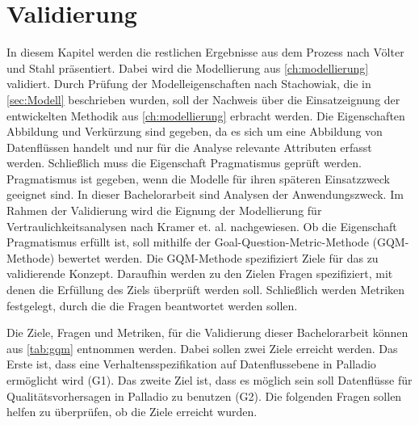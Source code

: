 
\chapter{Validierung}
\label{ch:validierung}
In diesem Kapitel werden die restlichen Ergebnisse aus dem Prozess nach Völter und Stahl \cite{StahlThomasVoelterMarkus2006} präsentiert. Dabei wird die Modellierung aus \autoref{ch:modellierung} validiert. Durch Prüfung der Modelleigenschaften nach Stachowiak, die in \autoref{sec:Modell} beschrieben wurden, soll der Nachweis über die Einsatzeignung der entwickelten Methodik aus \autoref{ch:modellierung} erbracht werden. Die Eigenschaften Abbildung und Verkürzung sind gegeben, da es sich um eine Abbildung von Datenflüssen handelt und nur für die Analyse relevante Attributen erfasst werden. Schließlich muss die Eigenschaft Pragmatismus geprüft werden. Pragmatismus ist gegeben, wenn die Modelle für ihren späteren Einsatzzweck geeignet sind. In dieser Bachelorarbeit sind Analysen der Anwendungszweck. Im Rahmen der Validierung wird die Eignung der Modellierung für Vertraulichkeitsanalysen nach Kramer et. al. \cite{Kramera} nachgewiesen. Ob die Eigenschaft Pragmatismus erfüllt ist, soll mithilfe der Goal-Question-Metric-Methode (GQM-Methode) \cite{Basili1984} bewertet werden. Die GQM-Methode spezifiziert Ziele für das zu validierende Konzept. Daraufhin werden zu den Zielen Fragen spezifiziert, mit denen die Erfüllung des Ziels überprüft werden soll. Schließlich werden Metriken festgelegt, durch die die Fragen beantwortet werden sollen.\par
Die Ziele, Fragen und Metriken, für die Validierung dieser Bachelorarbeit können aus \autoref{tab:gqm} entnommen werden. Dabei sollen zwei Ziele erreicht werden. Das Erste ist, dass eine Verhaltensspezifikation auf Datenflussebene in Palladio ermöglicht wird (G1). Das zweite Ziel ist, dass es möglich sein soll Datenflüsse für Qualitätsvorhersagen in Palladio zu benutzen (G2). Die folgenden Fragen sollen helfen zu überprüfen, ob die Ziele erreicht wurden. \par 
